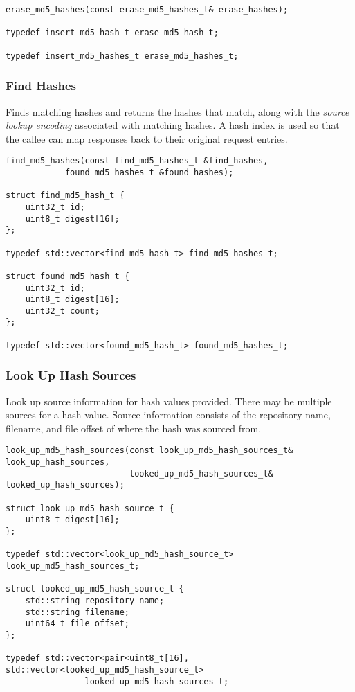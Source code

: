 \documentclass[12pt,twoside]{article}
\begin{document}
\begin{small}
\begin{verbatim}
erase_md5_hashes(const erase_md5_hashes_t& erase_hashes);

typedef insert_md5_hash_t erase_md5_hash_t;

typedef insert_md5_hashes_t erase_md5_hashes_t;
\end{verbatim}
\end{small}

\subsubsection{Find Hashes}
Finds matching hashes and returns the hashes that match,
along with the \emph{source lookup encoding}
associated with matching hashes.
A hash index is used so that the callee can map responses back
to their original request entries.

\begin{small}
\begin{verbatim}
find_md5_hashes(const find_md5_hashes_t &find_hashes,
            found_md5_hashes_t &found_hashes);

struct find_md5_hash_t {
    uint32_t id;
    uint8_t digest[16];
};

typedef std::vector<find_md5_hash_t> find_md5_hashes_t;

struct found_md5_hash_t {
    uint32_t id;
    uint8_t digest[16];
    uint32_t count;
};

typedef std::vector<found_md5_hash_t> found_md5_hashes_t;
\end{verbatim}
\end{small}

\subsubsection{Look Up Hash Sources}
Look up source information for hash values provided.
There may be multiple sources for a hash value.
Source information consists of the repository name, filename, and file offset
of where the hash was sourced from.

\begin{small}
\begin{verbatim}
look_up_md5_hash_sources(const look_up_md5_hash_sources_t& look_up_hash_sources,
                         looked_up_md5_hash_sources_t& looked_up_hash_sources);

struct look_up_md5_hash_source_t {
    uint8_t digest[16];
};

typedef std::vector<look_up_md5_hash_source_t> look_up_md5_hash_sources_t;

struct looked_up_md5_hash_source_t {
    std::string repository_name;
    std::string filename;
    uint64_t file_offset;
};

typedef std::vector<pair<uint8_t[16], std::vector<looked_up_md5_hash_source_t>
                looked_up_md5_hash_sources_t;
\end{verbatim}
\end{small}
\end{document}
